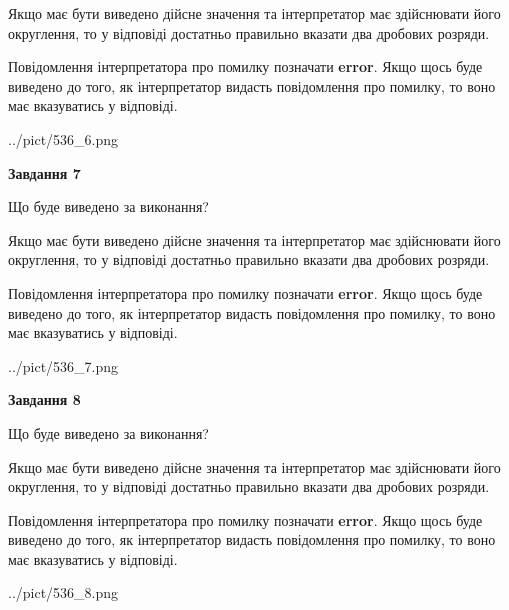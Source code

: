 \documentclass[12pt, ukrainian]{article}
\begin{document}
{\begin {Large}
Якщо має бути виведено дійсне значення та інтерпретатор має здійснювати його округлення, 
то у відповіді достатньо правильно вказати два дробових розряди.

Повідомлення інтерпретатора про помилку позначати \textbf{error}.
Якщо щось буде виведено до того, як інтерпретатор видасть повідомлення про помилку, 
то воно має вказуватись у відповіді. \par

\begin{center}
	{../pict/536_6.png}
\end{center}
\newpage

{\begin {center}\textbf{Завдання 7}\end {center}}\par
Що буде виведено за виконання? \par

Якщо має бути виведено дійсне значення та інтерпретатор має здійснювати його округлення, 
то у відповіді достатньо правильно вказати два дробових розряди.

Повідомлення інтерпретатора про помилку позначати \textbf{error}.
Якщо щось буде виведено до того, як інтерпретатор видасть повідомлення про помилку, 
то воно має вказуватись у відповіді. \par

\begin{center}
	{../pict/536_7.png}
\end{center}
\newpage

{\begin {center}\textbf{Завдання 8}\end {center}}\par
Що буде виведено за виконання? \par

Якщо має бути виведено дійсне значення та інтерпретатор має здійснювати його округлення, 
то у відповіді достатньо правильно вказати два дробових розряди.

Повідомлення інтерпретатора про помилку позначати \textbf{error}.
Якщо щось буде виведено до того, як інтерпретатор видасть повідомлення про помилку, 
то воно має вказуватись у відповіді. \par

\begin{center}
	{../pict/536_8.png}
\end{center}
\newpage


\end{Large}}
\end{document}
